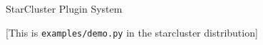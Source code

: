 \begin{frame}[fragile]{StarCluster Plugin System}
  

  \vspace*{0.5cm}
  [This is \texttt{examples/demo.py} in the starcluster distribution]
\end{frame}
